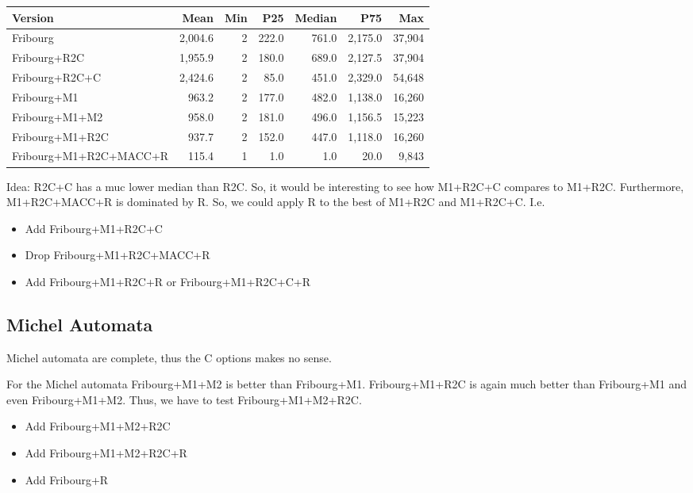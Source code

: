 \begin{table}[ht]
\centering
\begin{tabular}{lrrrrrr}
  \toprule
Version & Mean & Min & P25 & Median & P75 & Max \\ 
  \midrule
Fribourg & 2,004.6 & 2 & 222.0 & 761.0 & 2,175.0 & 37,904 \\ 
  Fribourg+R2C & 1,955.9 & 2 & 180.0 & 689.0 & 2,127.5 & 37,904 \\ 
  Fribourg+R2C+C & 2,424.6 & 2 & 85.0 & 451.0 & 2,329.0 & 54,648 \\ 
  Fribourg+M1 & 963.2 & 2 & 177.0 & 482.0 & 1,138.0 & 16,260 \\ 
  Fribourg+M1+M2 & 958.0 & 2 & 181.0 & 496.0 & 1,156.5 & 15,223 \\ 
  Fribourg+M1+R2C & 937.7 & 2 & 152.0 & 447.0 & 1,118.0 & 16,260 \\ 
  Fribourg+M1+R2C+MACC+R & 115.4 & 1 & 1.0 & 1.0 & 20.0 & 9,843 \\ 
   \bottomrule
\end{tabular}
\end{table}

Idea: R2C+C has a muc lower median than R2C. So, it would be interesting to see how M1+R2C+C compares to M1+R2C. Furthermore, M1+R2C+MACC+R is dominated by R. So, we could apply R to the best of M1+R2C and M1+R2C+C. I.e.
\begin{itemize}
\item Add Fribourg+M1+R2C+C
\item Drop Fribourg+M1+R2C+MACC+R
\item Add Fribourg+M1+R2C+R or Fribourg+M1+R2C+C+R
\end{itemize}



\subsection{Michel Automata}
Michel automata are complete, thus the C options makes no sense.

For the Michel automata Fribourg+M1+M2 is better than Fribourg+M1. Fribourg+M1+R2C is again much better than Fribourg+M1 and even Fribourg+M1+M2. Thus, we have to test Fribourg+M1+M2+R2C. 

\begin{itemize}
\item Add Fribourg+M1+M2+R2C
\item Add Fribourg+M1+M2+R2C+R
\item Add Fribourg+R
\end{itemize}



